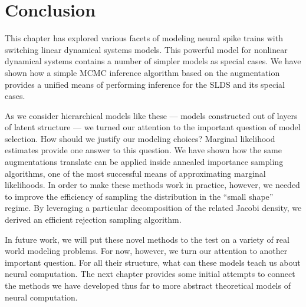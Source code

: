 \section{Conclusion}
This chapter has explored various facets of modeling neural spike
trains with switching linear dynamical systems models. This powerful
model for nonlinear dynamical systems contains a number of simpler
models as special cases. We have shown how a simple MCMC inference
algorithm based on the \polyagamma augmentation provides a unified
means of performing inference for the SLDS and its special cases.

As we consider hierarchical models like these --- models constructed out of
layers of latent structure --- we turned our attention to the
important question of model selection. How should we justify our
modeling choices? Marginal likelihood estimates provide one answer
to this question. We have shown how the same \polyagamma augmentations
translate can be applied inside annealed importance sampling algorithms,
one of the most successful means of approximating marginal likelihoods.
In order to make these methods work in practice, however, we needed to
improve the efficiency of sampling the \polyagamma distribution in the
``small shape'' regime. By leveraging a particular decomposition of the
related Jacobi density, we derived an efficient rejection sampling algorithm.

In future work, we will put these novel methods to the test on a variety
of real world modeling problems. For now, however, we turn our attention
to another important question. For all their structure, what can these
models teach us about neural computation. The next chapter provides some
initial attempts to connect the methods we have developed thus far to more
abstract theoretical models of neural computation. 

